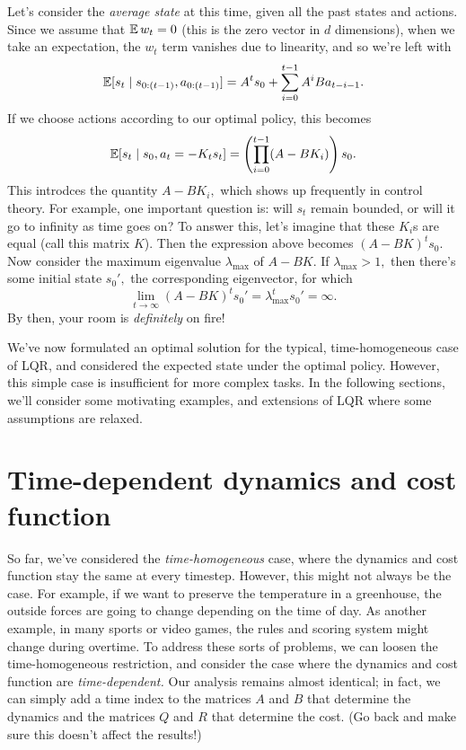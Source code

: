 \documentclass[../main/main]{subfiles}
\begin{document}
Let's consider the \emph{average state} at this time, given all the past states and actions.
Since we assume that $\operatorname*{\mathbb{E}} w_t = 0$ (this is the zero vector in $d$ dimensions),
when we take an expectation, the $w_t$ term vanishes due to linearity, and so we're left with \[
    \operatorname*{\mathbb{E}} [s_t \mid s_{0:(t-1)}, a_{0:(t-1)}] = A^t s_0 + \sum_{i=0}^{t-1} A^i B a_{t-i-1}.
\]
If we choose actions according to our optimal policy, this becomes \[
    \operatorname*{\mathbb{E}} [s_t \mid s_0, a_t = - K_t s_t] = \left( \prod_{i=0}^{t-1} (A - B K_i) \right) s_0.
\]
This introdces the quantity $A - B K_i,$ which shows up frequently in control theory.
For example, one important question is: will $s_t$ remain bounded,
or will it go to infinity as time goes on?
To answer this, let's imagine that these $K_i$s are equal (call this matrix $K$).
Then the expression above becomes $(A-BK)^t s_0.$
Now consider the maximum eigenvalue $\lambda_{\max}$ of $A - BK.$
If $\lambda_{\max} > 1,$ then there's some initial state $s_0',$ the corresponding eigenvector, for which \[
    \lim_{t \to \infty} (A - BK)^t s_0' = \lambda_{\max}^t s_0' = \infty.
\]
By then, your room is \emph{definitely} on fire!

We've now formulated an optimal solution for the typical, time-homogeneous case of LQR, and considered the expected state under the optimal policy.
However, this simple case is insufficient for more complex tasks.
In the following sections, we'll consider some motivating examples, and extensions of LQR where some assumptions are relaxed.

\section{Time-dependent dynamics and cost function} \label{sec:time_dep_lqr}

So far, we've considered the \emph{time-homogeneous} case, where the dynamics and cost function stay the same at every timestep. However, this might not always be the case. For example, if we want to preserve the temperature in a greenhouse, the outside forces are going to change depending on the time of day.
As another example, in many sports or video games, the rules and scoring system might change during overtime.
To address these sorts of problems, we can loosen the time-homogeneous restriction, and consider the case where the dynamics and cost function are \emph{time-dependent.}
Our analysis remains almost identical; in fact, we can simply add a time index to the matrices $A$ and $B$ that determine the dynamics and the matrices $Q$ and $R$ that determine the cost. (Go back and make sure this doesn't affect the results!)
\end{document}
